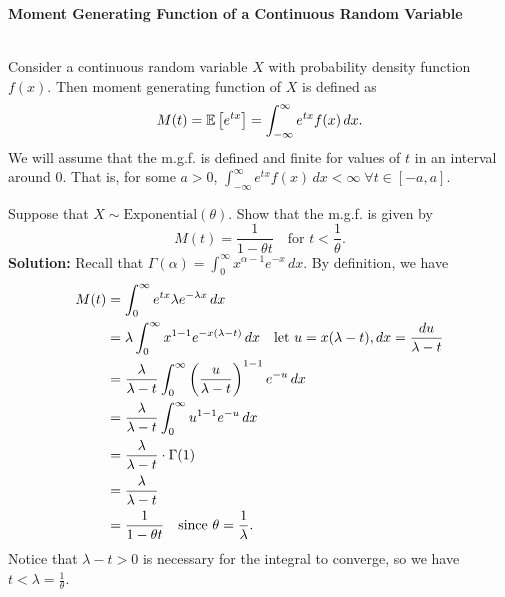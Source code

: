 \pagebreak

\textbf{Moment Generating Function of a Continuous Random Variable}

\begin{definition}
    \phantom{}\\
    Consider a continuous random variable $X$ with probability density function $f(x)$. Then moment generating function of $X$ is defined as
    \vspace{-3mm}
    \[
        M(t) = \mathbb{E}\left[{e^{tx}}\right] = \displaystyle \int_{-\infty}^{\infty} e^{tx} f(x) \, dx.
    \]
    We will assume that the m.g.f. is defined and finite for values of $t$ in an interval around 0. That is, for some $a > 0$, $\displaystyle \int_{-\infty}^{\infty} e^{tx} f(x) \, dx < \infty \; \forall t \in [-a,a]$.
\end{definition}

\begin{example}
    Suppose that $X \sim \text{Exponential}(\theta)$. Show that the m.g.f. is given by \vspace{-3mm}
    \[
        M(t) = \frac{1}{1 - \theta t} \quad \text{for $t < \frac{1}{\theta}$}.
    \]
    \textbf{Solution:} Recall that $\Gamma(\alpha) = \displaystyle \int_{0}^{\infty} x^{\alpha -1} e^{-x} \, dx$. By definition, we have \vspace{-3mm}
    \begin{align*}
        M(t) &= \displaystyle \int_{0}^{\infty} e^{tx} \lambda e^{-\lambda x} \, dx \\
        &= \lambda \displaystyle \int_{0}^{\infty} x^{1-1} e^{-x(\lambda - t)} \, dx \quad \text{let $u = x(\lambda - t)$}, dx = \frac{du}{\lambda - t} \\
        &= \displaystyle \frac{\lambda}{\lambda - t} \displaystyle \int_{0}^{\infty} \left( \frac{u}{\lambda - t} \right)^{1-1} e^{-u} \, dx \\
        &= \displaystyle \frac{\lambda}{\lambda - t} \displaystyle \int_{0}^{\infty} u^{1-1} e^{-u} \, dx \\
        &= \displaystyle \frac{\lambda}{\lambda - t} \cdot \Gamma(1) \\
        &= \displaystyle \frac{\lambda}{\lambda - t} \\
        &= \displaystyle \frac{1}{1 - \theta t} \quad \text{since $\theta = \frac{1}{\lambda}$}.
    \end{align*}
    Notice that $\lambda - t > 0$ is necessary for the integral to converge, so we have $t < \lambda = \frac{1}{\theta}$.
\end{example}

